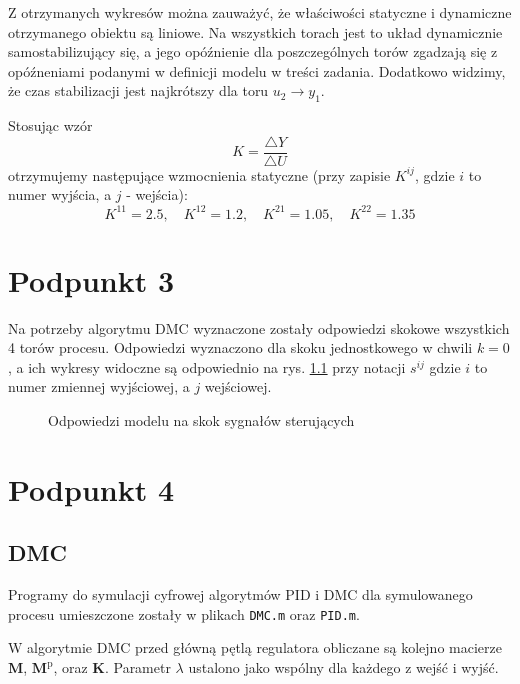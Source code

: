 Z otrzymanych wykresów można zauważyć, że właściwości statyczne i dynamiczne otrzymanego obiektu są liniowe. Na wszystkich torach jest to układ dynamicznie samostabilizujący się, a jego opóźnienie dla poszczególnych torów zgadzają się z opóźneniami podanymi w definicji modelu w treści zadania. Dodatkowo widzimy, że czas stabilizacji jest najkrótszy dla toru $u_2 \rightarrow y_1$.

Stosując wzór
\begin{equation}
K = \frac{ \triangle Y }{ \triangle U}
\end{equation}
otrzymujemy następujące wzmocnienia statyczne (przy zapisie $ K^{ij} $, gdzie $ i $ to numer wyjścia, a $ j $ - wejścia):
\begin{equation}
K^{11} = \num{2,5}, \quad K^{12} = \num{1,2}, \quad K^{21} = \num{1,05}, \quad K^{22} = \num{1,35}  
\end{equation}


\chapter{Podpunkt 3}
Na potrzeby algorytmu DMC wyznaczone zostały odpowiedzi skokowe wszystkich 4 torów procesu. Odpowiedzi wyznaczono dla skoku jednostkowego w chwili $ k=0 $, a ich wykresy widoczne są odpowiednio na rys. \ref{Z3} przy notacji $ s^{ij} $ gdzie $ i $ to numer zmiennej wyjściowej, a $ j $ wejściowej.

\begin{figure}[ht]
\centering

\caption{Odpowiedzi modelu na skok sygnałów sterujących}
\label{Z3}
\end{figure}


\chapter{Podpunkt 4}
\section{DMC}
Programy do symulacji cyfrowej algorytmów PID i DMC dla symulowanego procesu umieszczone zostały w plikach \verb+DMC.m+ oraz \verb+PID.m+.

W algorytmie DMC przed główną pętlą regulatora obliczane są kolejno macierze $ \boldsymbol{M} $, $ \boldsymbol{M}^\mathrm{p}$, oraz $ \boldsymbol{K} $. Parametr $ \lambda $ ustalono jako wspólny dla każdego z wejść i wyjść.



